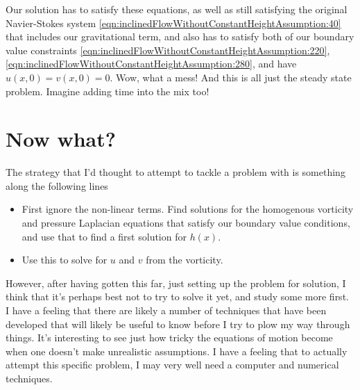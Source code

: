 Our solution has to satisfy these equations, as well as still satisfying the original Navier-Stokes system \ref{eqn:inclinedFlowWithoutConstantHeightAssumption:40} that includes our gravitational term, and also has to satisfy both of our boundary value constraints \ref{eqn:inclinedFlowWithoutConstantHeightAssumption:220}, \ref{eqn:inclinedFlowWithoutConstantHeightAssumption:280}, and have $u(x, 0) = v(x, 0) = 0$.  Wow, what a mess!  And this is all just the steady state problem.  Imagine adding time into the mix too!

\section{Now what?}

The strategy that I'd thought to attempt to tackle a problem with is something along the following lines

\begin{itemize}
\item First ignore the non-linear terms.  Find solutions for the homogenous vorticity and pressure Laplacian equations that satisfy our boundary value conditions, and use that to find a first solution for $h(x)$.
\item Use this to solve for $u$ and $v$ from the vorticity.
\end{itemize}

However, after having gotten this far, just setting up the problem for solution, I think that it's perhaps best not to try to solve it yet, and study some more first.  I have a feeling that there are likely a number of techniques that have been developed that will likely be useful to know before I try to plow my way through things.  It's interesting to see just how tricky the equations of motion become when one doesn't make unrealistic assumptions.  I have a feeling that to actually attempt this specific problem, I may very well need a computer and numerical techniques.

\EndNoBibArticle
